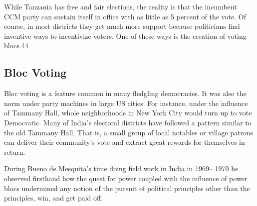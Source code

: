 \documentclass[10pt]{article}
\begin{document}
{\large While Tanzania has free and fair elections, the reality is that the
incumbent CCM party can sustain itself in office with as little as 5 percent of
the vote. Of course, in most districts they get much more support because
politicians find inventive ways to incentivize voters. One of these ways is the
creation of voting blocs.14}

\subsection{Bloc Voting}

{\large Bloc voting is a feature common in many fledgling democracies. It was
also the norm under party machines in large US cities. For instance, under the
influence of Tammany Hall, whole neighborhoods in New York City would turn up to
vote Democratic. Many of India's electoral districts have followed a pattern
similar to the old Tammany Hall. That is, a small group of local notables or
village patrons can deliver their community's vote and extract great rewards for
themselves in return.}

{\large During Bueno de Mesquita's time doing field work in India in 1969-- 1970
he observed firsthand how the quest for power coupled with the influence of power
blocs undermined any notion of the pursuit of political principles other than the
principles, win, and get paid off.}
\end{document}
